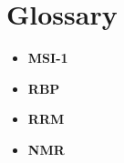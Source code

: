 \section{Glossary}

\begin{itemize}
    \item[]\textbf{MSI-1}
    \item[]\textbf{RBP}
    \item[]\textbf{RRM}
    \item[]\textbf{NMR}
\end{itemize}